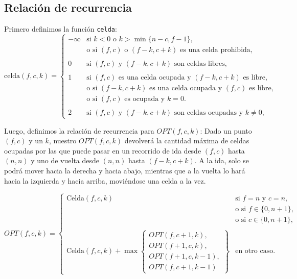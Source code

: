 \subsection{Relación de recurrencia}

Primero definimos la función \texttt{celda}:
\[
	\text{celda}(f, c, k) =
	\begin{cases}
		-\infty & \text{si } k < 0 \text{ o } k > \min\{n - c, f - 1\},                            \\
		        & \text{o si } (f, c) \text{ o } (f-k, c+k) \text{ es una celda prohibida},        \\ \\
		0       & \text{si } (f, c) \text{ y } (f-k, c+k) \text{ son celdas libres},               \\  \\
		1       & \text{si } (f, c) \text{ es una celda ocupada y } (f-k, c+k) \text{ es libre},   \\
		        & \text{o si } (f-k, c+k) \text{ es una celda ocupada y } (f, c) \text{ es libre}, \\
		        & \text{o si } (f, c) \text{ es ocupada y } k = 0.                                 \\ \\
		2       & \text{si } (f, c) \text{ y } (f-k, c+k) \text{ son celdas ocupadas y } k \neq 0,
	\end{cases}
\]


Luego, definimos la relación de recurrencia para $OPT(f, c, k)$:
Dado un punto $(f, c)$ y un $k$, nuestro $OPT(f, c, k)$ devolverá la cantidad máxima de celdas ocupadas por las que puede pasar en un recorrido de ida desde $(f, c)$
hasta $(n, n)$ y uno de vuelta desde $(n, n)$ hasta $(f - k, c + k)$. A la ida, solo se podrá mover hacia la derecha y hacia abajo, mientras que a la vuelta lo hará
hacia la izquierda y hacia arriba, moviéndose una celda a la vez.

\[
	OPT(f, c, k) =
	\begin{cases}
		\text{Celda}(f, c, k) & \text{si } f = n \text{ y } c = n, \\
		                      & \text{o si } f \in \{0, n+1\},     \\
		                      & \text{o si } c \in \{0, n+1\},     \\ \\
		\text{Celda}(f, c, k) + \max\left\{
		\begin{array}{l}
			OPT(f, c+1, k),   \\
			OPT(f+1, c, k),   \\
			OPT(f+1, c, k-1), \\
			OPT(f, c+1, k-1)
		\end{array}
		\right\}              & \text{en otro caso}.
	\end{cases}
\]